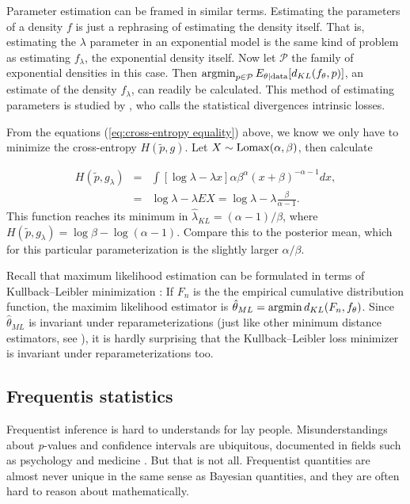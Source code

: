\begin{example}
Parameter estimation can be framed in similar terms. Estimating the
parameters of a density $f$ is just a rephrasing of estimating the
density itself. That is, estimating the $\lambda$ parameter in an
exponential model is the same kind of problem as estimating $f_{\lambda}$,
the exponential density itself. Now let $\mathcal{P}$ the family
of exponential densities in this case. Then $\operatorname{argmin}_{p\in\mathcal{P}}E_{\theta\mid\textrm{data}}[d_{KL}(f_{\theta},p)]$,
an estimate of the density $f_{\lambda}$, can readily be calculated.
This method of estimating parameters is studied by \cite{Robert1996-ii},
who calls the statistical divergences intrinsic losses. 

From the equations (\ref{eq:cross-entropy equality}) above, we know
we only have to minimize the cross-entropy $H(\tilde{p},g)$. Let
$X\sim\operatorname{Lomax}(\alpha,\beta)$, then calculate

\begin{eqnarray*}
H(\tilde{p},g_{\lambda}) & = & \int[\log\lambda-\lambda x]\alpha\beta^{\alpha}(x+\beta)^{-\alpha-1}dx,\\
 & = & \log\lambda-\lambda EX=\log\lambda-\lambda\frac{\beta}{\alpha-1}.
\end{eqnarray*}
This function reaches its minimum in $\hat{\lambda}_{KL}=(\alpha-1)/\beta$,
where $H(\tilde{p},g_{\lambda})=\log\beta-\log(\alpha-1)$. Compare
this to the posterior mean, which for this particular parameterization
is the slightly larger $\alpha/\beta$. 

Recall that maximum likelihood estimation can be formulated in terms
of Kullback--Leibler minimization \parencite[p. 25]{Claeskens2008-hk}:
If $F_{n}$ is the the empirical cumulative distribution function,
the maximim likelihood estimator is $\hat{\theta}_{ML}=\operatorname{argmin} d_{KL}(F_{n},f_{\theta})$.
Since $\hat{\theta}_{ML}$ is invariant under reparameterizations
(just like other minimum distance estimators, see \cite{Drossos1980-ar}),
it is hardly surprising that the Kullback--Leibler loss minimizer
is invariant under reparameterizations too. 
\end{example}


\subsection{Frequentis statistics}

Frequentist inference is hard to understands for lay people. Misunderstandings
about \emph{p}-values and confidence intervals are ubiquitous, documented
in fields such as psychology \parencite{Belia2005-di,Gigerenzer2018-oi}
and medicine \parencite{Goodman2008-ed,Gigerenzer2007-qi}. But that is
not all. Frequentist quantities are almost never unique in the same
sense as Bayesian quantities, and they are often hard to reason about
mathematically. 

